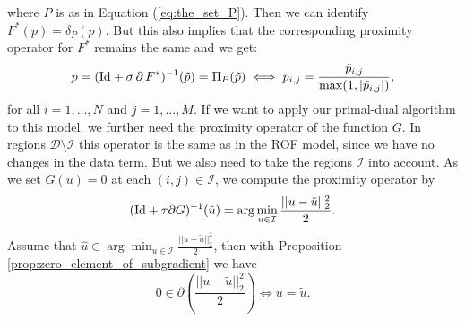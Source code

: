 \documentclass[abstracton]{scrreprt}
\begin{document}
        where $P$ is as in Equation (\ref{eq:the_set_P}). Then we can identify $F^{\ast}(p) = \delta_{P}(p)$. But this also implies that the corresponding proximity operator for $F^{\ast}$ remains the same and we get:
            \begin{equation}
                p = (\textnormal{Id} + \sigma\,\partial\,F^{\ast})^{-1}(\tilde{p}) = \Pi_{P}(\tilde{p}) \iff p_{i,j} = \frac{\tilde{p}_{i, j}}{\max(1, |\tilde{p}_{i, j}|)},
            \label{eq:proximity_operator_f_star_inpainting}
            \end{equation}
        for all $i = 1, ..., N$ and $j = 1, ..., M$. If we want to apply our primal-dual algorithm to this model, we further need the proximity operator of the function $G$. In regions $\mathcal{D} \setminus \mathcal{I}$ this operator is the same as in the ROF model, since we have no changes in the data term. But we also need to take the regions $\mathcal{I}$ into account. As we set $G(u) = 0$ at each $(i,j) \in \mathcal{I}$, we compute the proximity operator by
            $$
                (\textnormal{Id} + \tau \partial G)^{-1}(\tilde{u}) = \arg \min_{u \in \mathcal{I}} \frac{||u - \tilde{u}||_{2}^{2}}{2}.
            $$
        Assume that $\hat{u} \in \arg \min_{u \in \mathcal{I}} \frac{||u - \tilde{u}||_{2}^{2}}{2}$, then with Proposition \ref{prop:zero_element_of_subgradient} we have
            $$
                0 \in \partial \left( \frac{||u - \tilde{u}||_{2}^{2}}{2} \right) \iff u = \tilde{u}.
            $$
\end{document}

